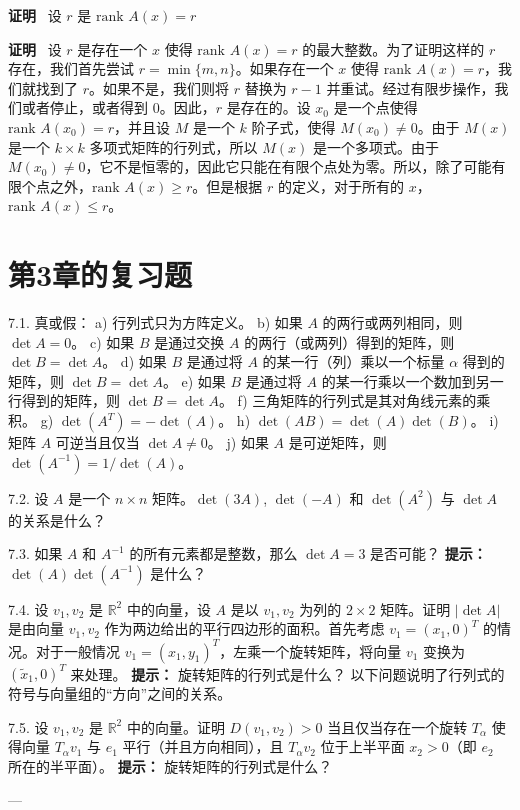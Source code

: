 

\textbf{证明}~ 设 $r$ 是 $\text{rank } A(x) = r$

\textbf{证明}~ 设 $r$ 是存在一个 $x$ 使得 $\text{rank } A(x) = r$ 的最大整数。为了证明这样的 $r$ 存在，我们首先尝试 $r = \min\{m, n\}$。如果存在一个 $x$ 使得 $\text{rank } A(x) = r$，我们就找到了 $r$。如果不是，我们则将 $r$ 替换为 $r-1$ 并重试。经过有限步操作，我们或者停止，或者得到 $0$。因此，$r$ 是存在的。设 $x_0$ 是一个点使得 $\text{rank } A(x_0) = r$，并且设 $M$ 是一个 $k$ 阶子式，使得 $M(x_0) \neq 0$。由于 $M(x)$ 是一个 $k \times k$ 多项式矩阵的行列式，所以 $M(x)$ 是一个多项式。由于 $M(x_0) \neq 0$，它不是恒零的，因此它只能在有限个点处为零。所以，除了可能有限个点之外，$\text{rank } A(x) \geq r$。但是根据 $r$ 的定义，对于所有的 $x$，$\text{rank } A(x) \leq r$。


\section{第3章的复习题}

7.1. 真或假：
a) 行列式只为方阵定义。
b) 如果 $A$ 的两行或两列相同，则 $\det A = 0$。
c) 如果 $B$ 是通过交换 $A$ 的两行（或两列）得到的矩阵，则 $\det B = \det A$。
d) 如果 $B$ 是通过将 $A$ 的某一行（列）乘以一个标量 $\alpha$ 得到的矩阵，则 $\det B = \det A$。
e) 如果 $B$ 是通过将 $A$ 的某一行乘以一个数加到另一行得到的矩阵，则 $\det B = \det A$。
f) 三角矩阵的行列式是其对角线元素的乘积。
g) $\det(A^T) = -\det(A)$。
h) $\det(AB) = \det(A)\det(B)$。
i) 矩阵 $A$ 可逆当且仅当 $\det A \neq 0$。
j) 如果 $A$ 是可逆矩阵，则 $\det(A^{-1}) = 1/\det(A)$。

7.2. 设 $A$ 是一个 $n \times n$ 矩阵。$\det(3A)$, $\det(-A)$ 和 $\det(A^2)$ 与 $\det A$ 的关系是什么？

7.3. 如果 $A$ 和 $A^{-1}$ 的所有元素都是整数，那么 $\det A = 3$ 是否可能？
\textbf{提示：} $\det(A)\det(A^{-1})$ 是什么？

7.4. 设 $v_1, v_2$ 是 $\mathbb{R}^2$ 中的向量，设 $A$ 是以 $v_1, v_2$ 为列的 $2 \times 2$ 矩阵。证明 $|\det A|$ 是由向量 $v_1, v_2$ 作为两边给出的平行四边形的面积。首先考虑 $v_1 = (x_1, 0)^T$ 的情况。对于一般情况 $v_1 = (x_1, y_1)^T$，左乘一个旋转矩阵，将向量 $v_1$ 变换为 $(\tilde{x}_1, 0)^T$ 来处理。
\textbf{提示：} 旋转矩阵的行列式是什么？
以下问题说明了行列式的符号与向量组的“方向”之间的关系。

7.5. 设 $v_1, v_2$ 是 $\mathbb{R}^2$ 中的向量。证明 $D(v_1, v_2) > 0$ 当且仅当存在一个旋转 $T_\alpha$ 使得向量 $T_\alpha v_1$ 与 $e_1$ 平行（并且方向相同），且 $T_\alpha v_2$ 位于上半平面 $x_2 > 0$（即 $e_2$ 所在的半平面）。
\textbf{提示：} 旋转矩阵的行列式是什么？

---
